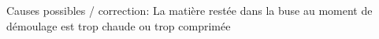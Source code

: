\documentclass[11pt,oneside]{article}
\begin{document}
        Causes possibles / correction: 
        La  matière  restée  dans  la  buse  au  moment  de  démoulage  est 
trop  chaude  ou  trop 
comprimée 
%          
%          
\end{document}
